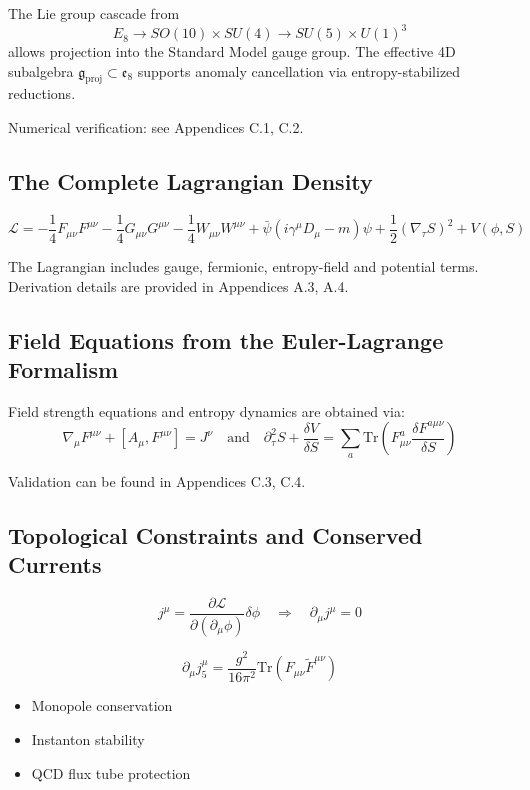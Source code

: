 \documentclass[10.5pt,a4paper]{article}
\begin{document}
The Lie group cascade from 
\[
E_8 \rightarrow SO(10) \times SU(4) \rightarrow SU(5) \times U(1)^3
\]
allows projection into the Standard Model gauge group. The effective 4D subalgebra 
\(\mathfrak{g}_{\text{proj}} \subset \mathfrak{e}_8\) supports anomaly cancellation via entropy-stabilized reductions.

Numerical verification: see Appendices C.1, C.2.

\subsection{The Complete Lagrangian Density}

\[
\mathcal{L} = -\frac{1}{4} F_{\mu\nu}F^{\mu\nu} - \frac{1}{4} G_{\mu\nu}G^{\mu\nu} - \frac{1}{4} W_{\mu\nu}W^{\mu\nu} 
+ \bar{\psi}(i\gamma^\mu D_\mu - m)\psi + \frac{1}{2} (\nabla_\tau S)^2 + V(\phi, S)
\]

The Lagrangian includes gauge, fermionic, entropy-field and potential terms. Derivation details are provided in Appendices A.3, A.4.

\subsection{Field Equations from the Euler-Lagrange Formalism}

Field strength equations and entropy dynamics are obtained via:
\[
\nabla_\mu F^{\mu\nu} + [A_\mu, F^{\mu\nu}] = J^\nu \quad\text{and}\quad \partial_\tau^2 S + \frac{\delta V}{\delta S} = \sum_a \mathrm{Tr}\left( F^{a}_{\mu\nu} \frac{\delta F^{a\mu\nu}}{\delta S} \right)
\]

Validation can be found in Appendices C.3, C.4.

\subsection{Topological Constraints and Conserved Currents}

\[
j^\mu = \frac{\partial \mathcal{L}}{\partial (\partial_\mu \phi)} \delta \phi \quad \Rightarrow \quad \partial_\mu j^\mu = 0
\]

\[
\partial_\mu j_5^\mu = \frac{g^2}{16\pi^2} \mathrm{Tr}(F_{\mu\nu} \tilde{F}^{\mu\nu})
\]

\begin{itemize}
    \item Monopole conservation
    \item Instanton stability
    \item QCD flux tube protection
\end{itemize}
\end{document}
